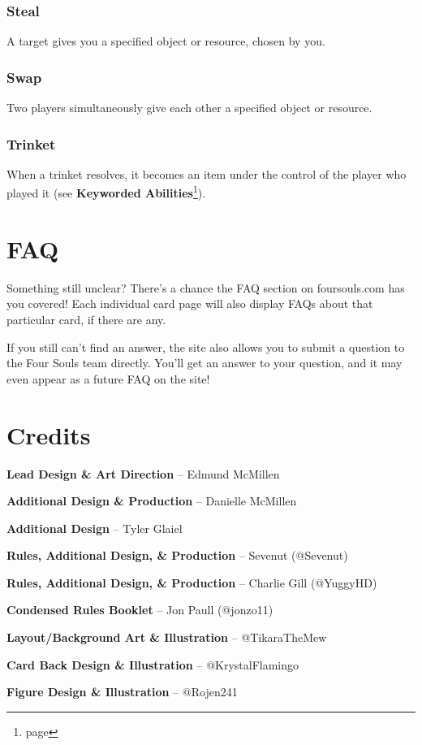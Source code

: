 \documentclass[a4paper, twoside]{report} %
\begin{document}
    \subsection*{Steal}
    A target gives you a specified object or resource, chosen by you.
    \subsection*{Swap}
    Two players simultaneously give each other a specified object or resource.
    \subsection*{Trinket}
    When a trinket resolves, it becomes an item under the control of the player who played it (see \textbf{Keyworded Abilities}\footnote{page \pageref{keyworded}}).

    \chapter{FAQ}
    Something still unclear? There’s a chance the FAQ section on foursouls.com has you covered! Each individual card page will also display FAQs about that particular card, if there are any.

    If you still can’t find an answer, the site also allows you to submit a question to the Four Souls team directly. You’ll get an answer to your question, and it may even appear as a future FAQ on the site!

    \chapter{Credits}
    \textbf{Lead Design \& Art Direction} – Edmund McMillen

    \textbf{Additional Design \& Production} – Danielle McMillen

    \textbf{Additional Design} – Tyler Glaiel

    \textbf{Rules, Additional Design, \& Production} – Sevenut (@Sevenut)

    \textbf{Rules, Additional Design, \& Production} – Charlie Gill (@YuggyHD)

    \textbf{Condensed Rules Booklet} – Jon Paull (@jonzo11)

    \textbf{Layout/Background Art \& Illustration} – @TikaraTheMew

    \textbf{Card Back Design \& Illustration} – @KrystalFlamingo

    \textbf{Figure Design \& Illustration} – @Rojen241
\end{document}
